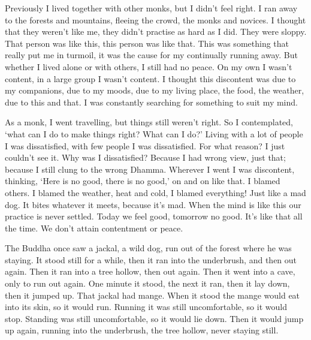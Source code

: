 Previously I lived together with other monks, but I didn't feel right. I ran away to the forests and mountains, fleeing the crowd, the monks and novices. I thought that they weren't like me, they didn't practise as hard as I did. They were sloppy. That person was like this, this person was like that. This was something that really put me in turmoil, it was the cause for my continually running away. But whether I lived alone or with others, I still had no peace. On my own I wasn't content, in a large group I wasn't content. I thought this discontent was due to my companions, due to my moods, due to my living place, the food, the weather, due to this and that. I was constantly searching for something to suit my mind.

As a  monk, I went travelling, but things still weren't right. So I contemplated, `what can I do to make things right? What can I do?' Living with a lot of people I was dissatisfied, with few people I was dissatisfied. For what reason? I just couldn't see it. Why was I dissatisfied? Because I had wrong view, just that; because I still clung to the wrong Dhamma. Wherever I went I was discontent, thinking, `Here is no good, there is no good,' on and on like that. I blamed others. I blamed the weather, heat and cold, I blamed everything! Just like a mad dog. It bites whatever it meets, because it's mad. When the mind is like this our practice is never settled. Today we feel good, tomorrow no good. It's like that all the time. We don't attain contentment or peace.

The Buddha once saw a jackal, a wild dog, run out of the forest where he was staying. It stood still for a while, then it ran into the underbrush, and then out again. Then it ran into a tree hollow, then out again. Then it went into a cave, only to run out again. One minute it stood, the next it ran, then it lay down, then it jumped up. That jackal had mange. When it stood the mange would eat into its skin, so it would run. Running it was still uncomfortable, so it would stop. Standing was still uncomfortable, so it would lie down. Then it would jump up again, running into the underbrush, the tree hollow, never staying still.

